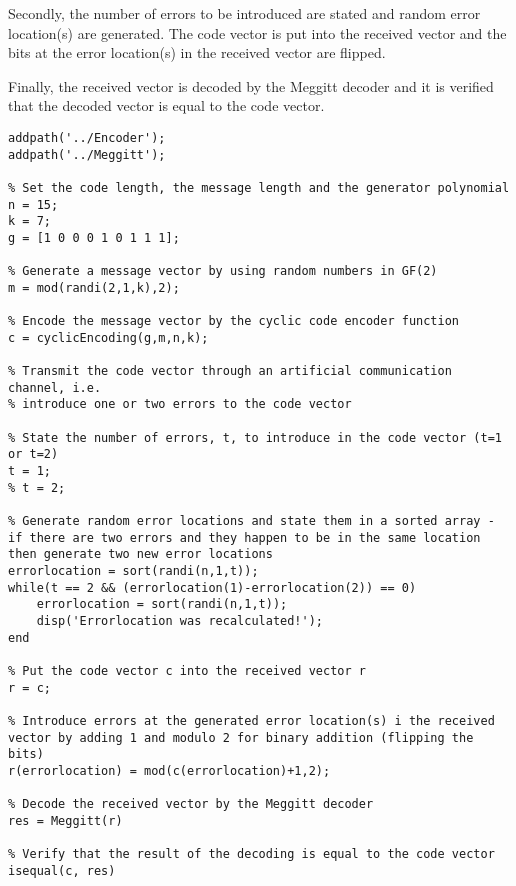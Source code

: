 \documentclass[Main]{subfiles}
\begin{document}
\noindent Secondly, the number of errors to be introduced are stated and random error location(s) are generated. The code vector is put into the received vector and the bits at the error location(s) in the received vector are flipped. 

\noindent Finally, the received vector is decoded by the Meggitt decoder and it is verified that the decoded vector is equal to the code vector.    

\begin{lstlisting}[caption=Main Function, style=Code-Matlab, label=lst:refID]
% This code makes use of the cyclic encoder and the Meggitt decoder 
addpath('../Encoder');
addpath('../Meggitt');

% Set the code length, the message length and the generator polynomial
n = 15;
k = 7;
g = [1 0 0 0 1 0 1 1 1];

% Generate a message vector by using random numbers in GF(2)
m = mod(randi(2,1,k),2);

% Encode the message vector by the cyclic code encoder function
c = cyclicEncoding(g,m,n,k);

% Transmit the code vector through an artificial communication channel, i.e.
% introduce one or two errors to the code vector 

% State the number of errors, t, to introduce in the code vector (t=1 or t=2)
t = 1;
% t = 2;

% Generate random error locations and state them in a sorted array - if there are two errors and they happen to be in the same location then generate two new error locations
errorlocation = sort(randi(n,1,t)); 
while(t == 2 && (errorlocation(1)-errorlocation(2)) == 0)
    errorlocation = sort(randi(n,1,t));
    disp('Errorlocation was recalculated!');
end

% Put the code vector c into the received vector r
r = c;

% Introduce errors at the generated error location(s) i the received vector by adding 1 and modulo 2 for binary addition (flipping the bits)
r(errorlocation) = mod(c(errorlocation)+1,2);

% Decode the received vector by the Meggitt decoder
res = Meggitt(r)

% Verify that the result of the decoding is equal to the code vector
isequal(c, res)
\end{lstlisting}
\end{document}
